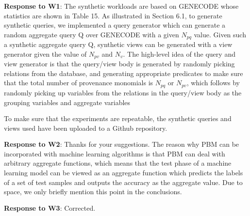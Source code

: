 \begin{appendix}
\textbf{Response to W1}:
The synthetic workloads are based on GENECODE whose statistics are shown in Table 15. As illustrated in Section 6.1, to generate synthetic queries, we implemented a query generator which can generate a random aggregate query Q over GENECODE with a given $N_{pq}$ value. Given such a synthetic aggregate query Q, synthetic views can be generated with a view generator given the value of $N_{pv}$ and $N_v$. The high-level idea of the query and view generator is that the query/view body is generated by randomly picking relations from the database, and generating appropriate predicates to make sure that the total number of provenance monomials is $N_{pq}$ or $N_{pv}$, which follows by randomly picking up variables from the relations in the query/view body as the grouping variables and aggregate variables

To make sure that the experiments are repeatable, the synthetic queries and views used have been uploaded to a Github repository.

\textbf{Response to W2}:
Thanks for your suggestions. The reason why PBM can be incorporated with machine learning algorithms is that PBM can deal with arbitrary aggregate functions, which means that the test phase of a machine learning model can be viewed as an aggregate function which predicts the labels of a set of test samples and outputs the accuracy as the aggregate value. Due to space, we only briefly mention this point in the conclusions.


\textbf{Response to W3}: Corrected.


\end{appendix}